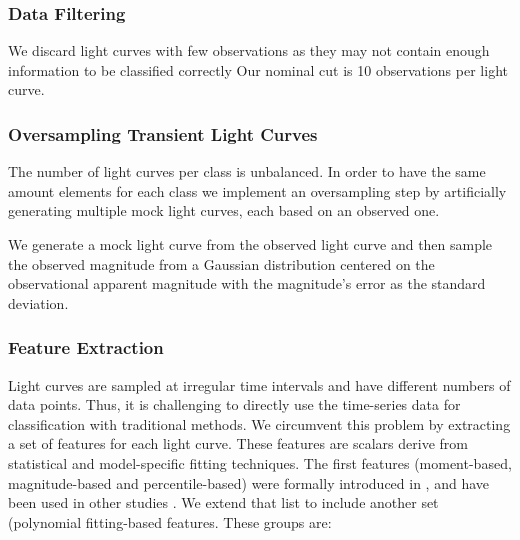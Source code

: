 \documentclass[a4paper,fleqn,usenatbib]{mnras}
\begin{document}
\subsubsection{Data Filtering} \label{subsection_filtering}

We discard light curves with few observations as they may not contain
enough information to be classified correctly
Our nominal cut is 10 observations per light curve.


\subsubsection{Oversampling Transient Light Curves} \label{subsection_oversampling}

The number of light curves per class is unbalanced. 
In order to have the same amount elements for each class we implement an
oversampling step by artificially generating multiple mock light curves,
each based on an observed one. 

We generate a mock light curve from the observed light curve and 
then sample the observed magnitude from a Gaussian distribution
centered on the observational apparent magnitude with the magnitude's
error as the standard deviation. 


\subsubsection{Feature Extraction} \label{subsection_extraction}

Light curves are sampled at irregular time intervals and have
different numbers of data points.
Thus, it is challenging to directly use the time-series data for
classification with traditional methods.
We circumvent this problem by extracting a set of features for each
light curve.
These features are scalars derive from statistical and model-specific
fitting techniques. 
The first features (moment-based, magnitude-based and
percentile-based) were formally introduced in 
\cite{1101.1959}, and have been used in other studies \citep{1603.00882,1601.03931}.  
We extend that list to include another set (polynomial fitting-based features. 
These groups are:
\end{document}

